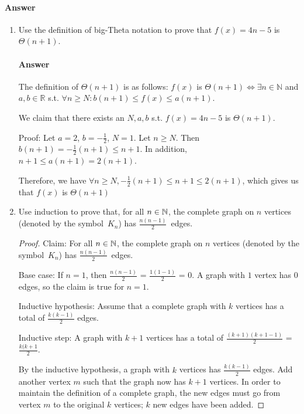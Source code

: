 \documentclass{article}
\begin{document}
\paragraph{Answer}
\todo{}

\collab{\todo{}}

\begin{enumerate}

    \item Use the definition of big-Theta notation to prove that $f(x)=4n-5$
        is $\Theta(n+1)$.

        \paragraph{Answer}{The definition of $\Theta(n+1)$ is as follows: $f(x)$ is $\Theta(n+1) \Leftrightarrow \exists  n \in \mathbb{N}$ and $a, b \in \mathbb{R}$ s.t. $\forall n \geq N: b(n + 1) \leq f(x) \leq a(n + 1).$ 

We claim that there exists an $N, a, b$ s.t. $f(x) = 4n-5$ is $\Theta(n + 1).$ 

Proof: Let $a = 2$, $b = -\frac{1}{2}$, $N = 1$. Let $n \geq N$. Then $b(n+1) = -\frac{1}{2}(n+1) \leq n+1$. In addition, $n + 1 \leq a(n+1) = 2(n+1)$. 

Therefore, we have $\forall n \geq N, -\frac{1}{2}(n+1) \leq n + 1 \leq 2(n+1)$, which gives us that $f(x)$ is $\Theta(n+1)$}

    \item Use induction to prove that, for all $n \in {\mathbb N}$, the complete graph on
        $n$ vertices (denoted by the symbol~$K_n$) has $\frac{n(n-1)}{2}$~edges.

        \begin{proof}
	Claim: For all $n \in {\mathbb N}$, the complete graph on
        $n$ vertices (denoted by the symbol~$K_n$) has $\frac{n(n-1)}{2}$~edges.
	
	Base case: If $n = 1$, then $\frac{n(n-1)}{2}$ = $\frac{1(1-1)}{2}$ = $0$. A graph with $1$ vertex has $0$ edges, so the claim is true for $n = 1$.

	Inductive hypothesis: Assume that a complete graph with $k$ vertices has a total of $\frac{k(k-1)}{2}$ edges.

	Inductive step: A graph with $k + 1$ vertices has a total of $\frac{(k+1)(k+1-1)}{2}$ = $\frac{k(k+1}{2}$. 

	By the inductive hypothesis, a graph with $k$ vertices has $\frac{k(k-1)}{2}$ edges. Add another vertex $m$ such that the graph now has $k+1$ vertices. In order to maintain the definition of a complete graph, the new edges must go from vertex $m$ to the original $k$ vertices; $k$ new edges have been added. 


\end{proof}
\end{enumerate}
\end{document}
